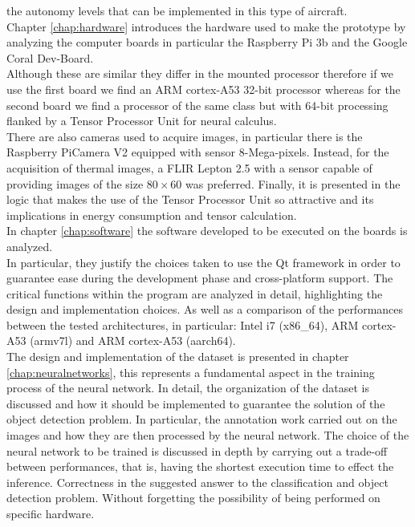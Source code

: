 the autonomy levels that can be implemented in this type of aircraft.\\
\noindent Chapter \ref{chap:hardware} introduces the hardware used to make the
prototype by analyzing the computer boards in particular the Raspberry Pi 3b and
the Google Coral Dev-Board.\\
Although these are similar they differ in the mounted processor therefore if we
use the first board we find an ARM cortex-A53 32-bit processor whereas for the
second board we find a processor of the same class but with 64-bit processing
flanked by a Tensor Processor Unit for neural calculus.\\
There are also cameras used to acquire images, in particular there is the
Raspberry PiCamera V2 equipped with sensor 8-Mega-pixels. 
Instead, for the acquisition of thermal images, a FLIR Lepton 2.5 with a sensor
capable of providing images of the size $ 80 \times 60 $ was preferred.
Finally, it is presented in the logic that makes the use of the Tensor Processor
Unit so attractive and its implications in energy consumption and tensor
calculation.\\
\noindent In chapter \ref{chap:software} the software developed to be executed
on the boards is analyzed.\\ 
In particular, they justify the choices taken to use the Qt framework in
order to guarantee ease during the development phase and cross-platform support.
The critical functions within the program are analyzed in detail, highlighting
the design and implementation choices.
As well as a comparison of the performances between the tested architectures, in
particular: Intel i7 (x86\_64), ARM cortex-A53 (armv7l) and ARM cortex-A53
(aarch64).\\
\noindent The design and implementation of the dataset is presented in chapter
\ref{chap:neuralnetworks}, this represents a fundamental aspect in the training
process of the neural network.
In detail, the organization of the dataset is discussed and how it should be
implemented to guarantee the solution of the object detection problem.
In particular, the annotation work carried out on the images and how they are
then processed by the neural network.
The choice of the neural network to be trained is discussed in depth by carrying
out a trade-off between performances, that is, having the shortest execution
time to effect the inference. 
Correctness in the suggested answer to the classification and object detection
problem. 
Without forgetting the possibility of being performed on specific hardware.\\

